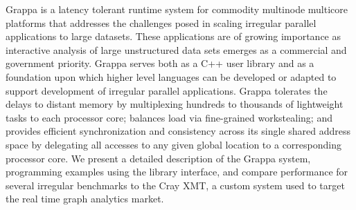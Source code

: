 Grappa is a latency tolerant runtime system for commodity multinode multicore
platforms that addresses the challenges posed in scaling irregular parallel
applications to large datasets. These applications are of growing importance
as interactive analysis of large unstructured data sets emerges as a
commercial and government priority. Grappa serves both as a C++ user library
and as a foundation upon which higher level languages can be developed or
adapted to support development of irregular parallel applications. Grappa
tolerates the delays to distant memory by multiplexing hundreds to thousands
of lightweight tasks to each processor core; balances load via fine-grained
workstealing; and provides efficient synchronization and consistency across
its single shared address space by delegating all accesses to any given global
location to a corresponding processor core. We present a detailed description
of the Grappa system, programming examples using the library interface, and
compare performance for several irregular benchmarks to the Cray XMT, a custom
system used to target the real time graph analytics market.